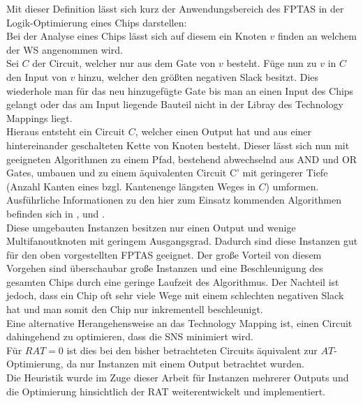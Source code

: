 \documentclass[11pt, a4paper, german]{article}
\newcommand{\TM}{Technology  Mapping }
\begin{document}
Mit dieser Definition l\"asst sich kurz der Anwendungsbereich des FPTAS in der Logik-Optimierung eines Chips darstellen:\\
Bei der Analyse eines Chips lässt sich auf diesem ein Knoten $v$ finden an welchem der WS angenommen wird.\\
Sei $C$ der Circuit, welcher nur aus dem Gate von $v$ besteht. Füge nun zu $v$ in $C$ den Input von $v$ hinzu, welcher den größten negativen Slack besitzt. Dies wiederhole man für das neu hinzugefügte Gate bis man an einen Input des Chips gelangt oder das am Input liegende Bauteil nicht in der Libray des Technology Mappings liegt. \\
Hieraus entsteht ein Circuit $C$, welcher einen Output hat und aus einer hintereinander geschalteten Kette von Knoten besteht. Dieser lässt sich nun mit geeigneten Algorithmen zu einem Pfad, bestehend abwechselnd aus AND und OR Gates,  umbauen und  zu einem äquivalenten Circuit C' mit geringerer Tiefe (Anzahl Kanten eines bzgl. Kantenenge längsten  Weges in $C$) umformen. Ausführliche Informationen zu den hier zum Einsatz kommenden Algorithmen befinden sich in \cite{Werber}, \cite{Hermann} und \cite{HeldPrefixAdders}.\\

Diese umgebauten Instanzen besitzen nur einen Output und wenige Multifanoutknoten mit geringem Ausgangsgrad. Dadurch sind diese Instanzen gut für den oben vorgestellten FPTAS geeignet. Der große Vorteil von diesem Vorgehen sind überschaubar große Instanzen und eine Beschleunigung des gesamten Chips durch eine geringe Laufzeit des Algorithmus. Der Nachteil ist jedoch, dass ein Chip oft sehr viele Wege mit einem schlechten negativen Slack hat und man somit den Chip nur inkrementell beschleunigt.\\

Eine alternative Herangehensweise an das \TM ist, einen Circuit dahingehend zu optimieren, dass die SNS minimiert wird.\\ F\"ur $RAT=0$ ist dies bei den bisher betrachteten Circuits äquivalent zur $AT$-Optimierung, da nur Instanzen mit einem Output betrachtet wurden.\\
Die Heuristik wurde im Zuge dieser Arbeit für Instanzen mehrerer Outputs und die Optimierung hinsichtlich der RAT weiterentwickelt und implementiert. 
\end{document}
